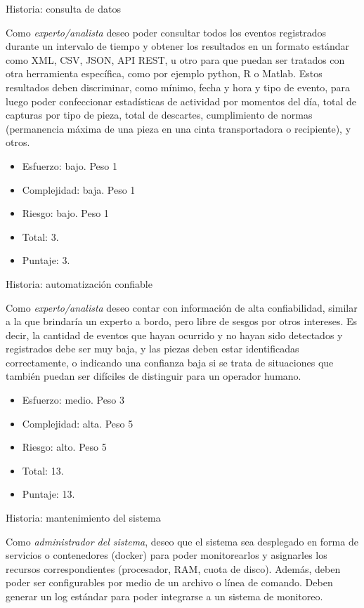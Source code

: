 \documentclass[11pt]{charter}
\begin{document}
Historia: consulta de datos

Como {\em experto/analista } deseo poder consultar todos los eventos registrados durante un intervalo de tiempo y obtener los resultados en un formato estándar como XML, CSV, JSON, API REST, u otro para que puedan ser tratados con otra herramienta específica, como por ejemplo python, R o Matlab. 
Estos resultados deben discriminar, como mínimo, fecha y hora y tipo de evento, para luego poder confeccionar estadísticas de actividad por momentos del día, total de capturas por tipo de pieza, total de descartes, cumplimiento de normas (permanencia máxima de una pieza en una cinta transportadora o recipiente), y otros.
\begin{itemize}
	\item Esfuerzo: bajo. Peso 1
	\item Complejidad: baja. Peso 1
	\item Riesgo: bajo. Peso 1
	\item Total: 3.
	\item Puntaje: 3.
\end{itemize}
	
Historia: automatización confiable
	
Como {\em experto/analista} deseo contar con información de alta confiabilidad, similar a la que brindaría un experto a bordo, pero libre de sesgos por otros intereses. Es decir, la cantidad de eventos que hayan ocurrido y no hayan sido detectados y registrados debe ser muy baja, y las piezas deben estar identificadas correctamente, o indicando una confianza baja si se trata de situaciones que también puedan ser difíciles de distinguir para un operador humano.
\begin{itemize}
	\item Esfuerzo: medio. Peso 3
	\item Complejidad: alta. Peso 5
	\item Riesgo: alto. Peso 5
	\item Total: 13.
	\item Puntaje: 13.
\end{itemize}

Historia: mantenimiento del sistema

Como {\em administrador del sistema}, deseo que el sistema sea desplegado en forma de servicios o contenedores (docker) para poder monitorearlos y asignarles los recursos correspondientes (procesador, RAM, cuota de disco). Además, deben poder ser configurables por medio de un archivo o línea de comando. Deben generar un log estándar para poder integrarse a un sistema de monitoreo.
	
\end{document}
